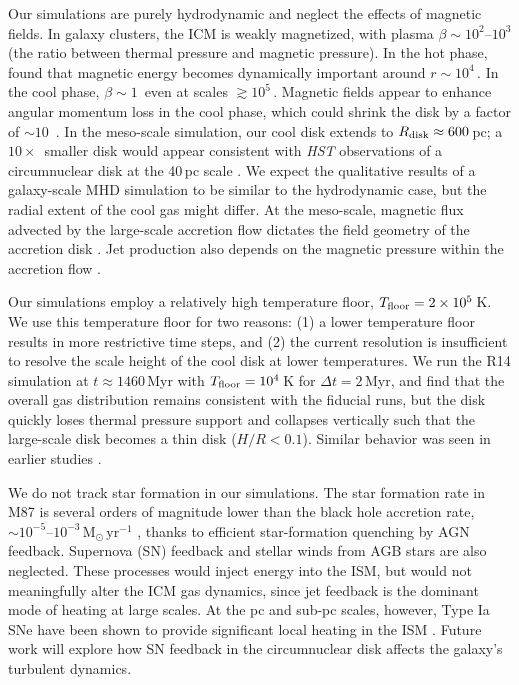 Our simulations are purely hydrodynamic and neglect the effects of magnetic fields.
In galaxy clusters, the ICM is weakly magnetized, with plasma $\beta \sim 10^2$--$10^3$ (the ratio between thermal pressure and magnetic pressure).
In the hot phase, \citet{guo_magnetized_2024} found that magnetic energy becomes dynamically important around $r \sim 10^4$\,\rg.
In the cool phase, $\beta \sim 1$\ even at scales $\gtrsim 10^5$\,\rg. Magnetic fields appear to enhance angular momentum loss in the cool phase, which could shrink the disk by a factor of $\sim 10$\ \citep[e.g.,][]{wang_chaotic_2020}.
In the meso-scale simulation, our cool disk extends to $R_{\rm disk}\approx600$\,pc; a $10\times$\ smaller disk would appear consistent with \textit{HST} observations of a circumnuclear disk at the 40\,pc scale \citep[][]{walsh_m87_2013}.
We expect the qualitative results of a galaxy-scale MHD simulation to be similar to the hydrodynamic case, but the radial extent of the cool gas might differ.
At the meso-scale, magnetic flux advected by the large-scale accretion flow dictates the field geometry of the accretion disk \citep[][]{lubow_magnetic_1994}.
Jet production also depends on the magnetic pressure within the accretion flow \citep[e.g.,][]{proga_magnetohydrodynamic_2005}.

Our simulations employ a relatively high temperature floor, $T_{\rm floor} = 2\times 10^5$\,K.
We use this temperature floor for two reasons: (1) a lower temperature floor results in more restrictive time steps, and (2) the current resolution is insufficient to resolve the scale height of the cool disk at lower temperatures.
We run the R14 simulation at $t\approx1460$\,Myr with $T_{\rm floor} = 10^4$\,K for $\Delta t= 2\,$Myr, and find that the overall gas distribution remains consistent with the fiducial runs, but the disk quickly loses thermal pressure support and collapses vertically such that the large-scale disk becomes a thin disk ($H/R < 0.1$).
Similar behavior was seen in earlier studies \citep[e.g.,][]{guo_toward_2023}.

We do not track star formation in our simulations. The star formation rate in M87 is several orders of magnitude lower than the black hole accretion rate, $\sim 10^{-5}$--$10^{-3}\,\mathrm{M_{\odot}\,yr^{-1}}$ \citep[e.g.,][]{tan_star-forming_2005,tamhane_constraining_2025}, thanks to efficient star-formation quenching by AGN feedback.
Supernova (SN) feedback and stellar winds from AGB stars are also neglected.
These processes would inject energy into the ISM, but would not meaningfully alter the ICM gas dynamics, since jet feedback is the dominant mode of heating at large scales.
At the pc and sub-pc scales, however, Type Ia SNe have been shown to provide significant local heating in the ISM \citep[][]{li_impact_2020}.
Future work will explore how SN feedback in the circumnuclear disk affects the galaxy's turbulent dynamics.


